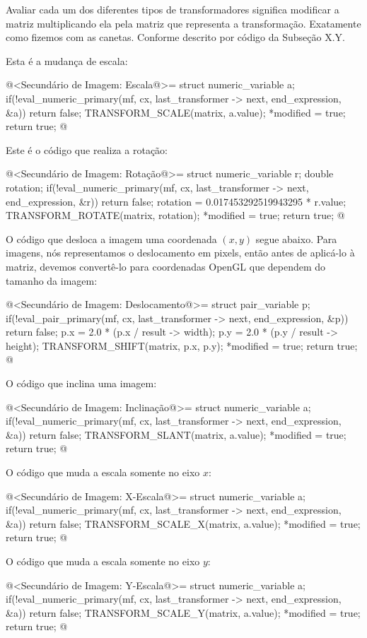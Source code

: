 {{{{{{Avaliar cada um dos diferentes tipos de transformadores significa
modificar a matriz multiplicando ela pela matriz que representa a
transformação. Exatamente como fizemos com as canetas. Conforme
descrito por código da Subseção X.Y.

Esta é a mudança de escala:

\iniciocodigo
@<Secundário de Imagem: Escala@>=
struct numeric_variable a;
if(!eval_numeric_primary(mf, cx, last_transformer -> next, end_expression, &a))
  return false;
TRANSFORM_SCALE(matrix, a.value);
*modified = true;
return true;
@
\fimcodigo

Este é o código que realiza a rotação:

\iniciocodigo
@<Secundário de Imagem: Rotação@>=
struct numeric_variable r;
double rotation;
if(!eval_numeric_primary(mf, cx, last_transformer -> next, end_expression, &r))
  return false;
rotation = 0.017453292519943295 * r.value;
TRANSFORM_ROTATE(matrix, rotation);
*modified = true;
return true;
@
\fimcodigo

O código que desloca a imagem uma coordenada $(x, y)$ segue
abaixo. Para imagens, nós representamos o deslocamento em pixels,
então antes de aplicá-lo à matriz, devemos convertê-lo para
coordenadas OpenGL que dependem do tamanho da imagem:

\iniciocodigo
@<Secundário de Imagem: Deslocamento@>=
struct pair_variable p;
if(!eval_pair_primary(mf, cx, last_transformer -> next, end_expression, &p))
  return false;
p.x = 2.0 * (p.x / result -> width);
p.y = 2.0 * (p.y / result -> height);
TRANSFORM_SHIFT(matrix, p.x, p.y);
*modified = true;
return true;
@
\fimcodigo

O código que inclina uma imagem:

\iniciocodigo
@<Secundário de Imagem: Inclinação@>=
struct numeric_variable a;
if(!eval_numeric_primary(mf, cx, last_transformer -> next, end_expression, &a))
  return false;
TRANSFORM_SLANT(matrix, a.value);
*modified = true;
return true;
@
\fimcodigo

O código que muda a escala somente no eixo $x$:

\iniciocodigo
@<Secundário de Imagem: X-Escala@>=
struct numeric_variable a;
if(!eval_numeric_primary(mf, cx, last_transformer -> next, end_expression, &a))
  return false;
TRANSFORM_SCALE_X(matrix, a.value);
*modified = true;
return true;
@
\fimcodigo

O código que muda a escala somente no eixo $y$:

\iniciocodigo
@<Secundário de Imagem: Y-Escala@>=
struct numeric_variable a;
if(!eval_numeric_primary(mf, cx, last_transformer -> next, end_expression, &a))
  return false;
TRANSFORM_SCALE_Y(matrix, a.value);
*modified = true;
return true;
@
\fimcodigo

}}}}}}
